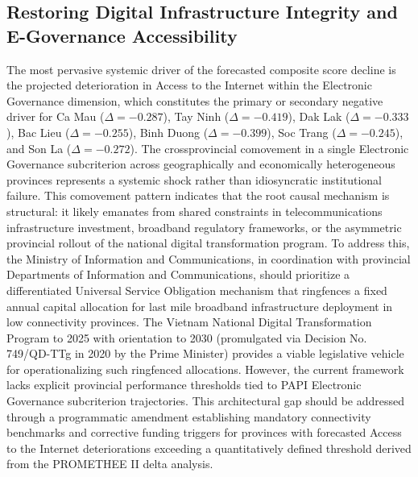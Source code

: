 \documentclass[12pt,a4paper]{article}
\begin{document}
\subsection{Restoring Digital Infrastructure Integrity and E-Governance Accessibility}
\label{subsec:policy_digital}

The most pervasive systemic driver of the forecasted composite score decline is the projected deterioration in Access to the Internet within the Electronic Governance dimension, which constitutes the primary or secondary negative driver for Ca Mau ($\Delta = -0.287$), Tay Ninh ($\Delta = -0.419$), Dak Lak ($\Delta = -0.333$), Bac Lieu ($\Delta = -0.255$), Binh Duong ($\Delta = -0.399$), Soc Trang ($\Delta = -0.245$), and Son La ($\Delta = -0.272$). The crossprovincial comovement in a single Electronic Governance subcriterion across geographically and economically heterogeneous provinces represents a systemic shock rather than idiosyncratic institutional failure. This comovement pattern indicates that the root causal mechanism is structural: it likely emanates from shared constraints in telecommunications infrastructure investment, broadband regulatory frameworks, or the asymmetric provincial rollout of the national digital transformation program. To address this, the Ministry of Information and Communications, in coordination with provincial Departments of Information and Communications, should prioritize a differentiated Universal Service Obligation mechanism that ringfences a fixed annual capital allocation for last mile broadband infrastructure deployment in low connectivity provinces. The Vietnam National Digital Transformation Program to 2025 with orientation to 2030 (promulgated via Decision No. 749/QD-TTg in 2020 by the Prime Minister) provides a viable legislative vehicle for operationalizing such ringfenced allocations. However, the current framework lacks explicit provincial performance thresholds tied to PAPI Electronic Governance subcriterion trajectories. This architectural gap should be addressed through a programmatic amendment establishing mandatory connectivity benchmarks and corrective funding triggers for provinces with forecasted Access to the Internet deteriorations exceeding a quantitatively defined threshold derived from the PROMETHEE II delta analysis.
\end{document}
